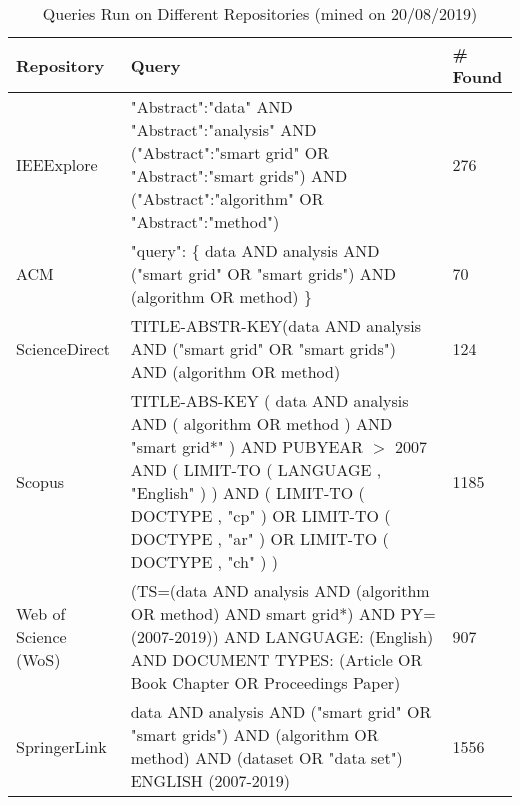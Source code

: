\documentclass[journal]{IEEEtran}
\begin{document}
\begin{table*}[!t]
\renewcommand{\arraystretch}{1.3}
\caption{Queries Run on Different Repositories (mined on 20/08/2019)}
\label{tbl:queries}
\scriptsize
\centering
\begin{tabular}{|p{2.8cm}||p{12cm}|p{1.5cm}|}
\hline
Repository & Query & \# Found  \\
\hline
IEEExplore & 
"Abstract":"data" AND "Abstract":"analysis" AND ("Abstract":"smart grid" OR "Abstract":"smart grids") AND ("Abstract":"algorithm" OR "Abstract":"method") & 276  \\
\hline  %
ACM & 
"query": \{ data AND analysis AND ("smart grid" OR "smart grids") AND (algorithm OR method) \}  & 70 \\ %
\hline
ScienceDirect  & 
TITLE-ABSTR-KEY(data AND analysis AND ("smart grid" OR "smart grids") AND (algorithm OR method)
 & 124 \\ %
\hline
Scopus  & 
 TITLE-ABS-KEY ( data  AND  analysis  AND  ( algorithm  OR  method )  AND  "smart grid*" )  AND  PUBYEAR  $>$  2007  AND  ( LIMIT-TO ( LANGUAGE ,  "English" ) )  AND  ( LIMIT-TO ( DOCTYPE ,  "cp" )  OR  LIMIT-TO ( DOCTYPE ,  "ar" )  OR  LIMIT-TO ( DOCTYPE ,  "ch" ) ) 
 & 1185 \\ %
\hline
Web of Science (WoS)  & 
(TS=(data AND analysis AND (algorithm OR method) AND smart grid*) AND PY=(2007-2019)) AND LANGUAGE: (English) AND DOCUMENT TYPES: (Article OR Book Chapter OR Proceedings Paper)
 & 907 \\ %
\hline
SpringerLink  & 
data AND analysis AND ("smart grid" OR "smart grids") AND (algorithm OR method) AND (dataset OR "data set") ENGLISH (2007-2019) & 1556\\ %
\hline
\end{tabular}
\end{table*}
\end{document}
